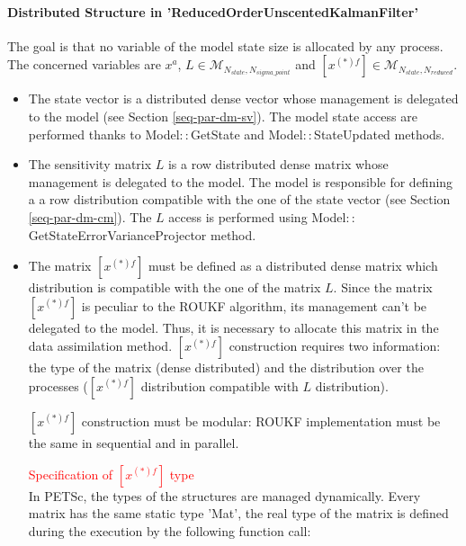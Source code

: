 \hypertarget{seq-par-roukf-ds}{}\paragraph{Distributed Structure in 'ReducedOrderUnscentedKalmanFilter'}\label{seq-par-roukf-ds}


The goal is that no variable of the model state size is allocated by any process. The concerned variables are  $x^a$, $L \in \mathcal{M}_{N_{state}, N_{sigma\_point}}$ and $ [x^{(*)f}] \in \mathcal{M}_{N_{state}, N_{reduced}}$.


\begin{itemize}

\item The state vector is a distributed dense vector whose management is delegated to the model (see Section \ref{seq-par-dm-sv}). The model state access are performed thanks to Model$::$GetState and Model$::$StateUpdated methods.

\item The sensitivity matrix $L$ is a row distributed dense matrix whose management is delegated to the model. The model is responsible for defining a a row distribution compatible with the one of the state vector (see Section \ref{seq-par-dm-cm}). The $L$ access is performed using Model$::$GetStateErrorVarianceProjector method.

\item The matrix $ [x^{(*)f}]$ must be defined as a distributed dense matrix which distribution is compatible with the one of the matrix $L$. Since the matrix  $ [x^{(*)f}]$ is peculiar to the ROUKF algorithm, its management can't be delegated to the model. Thus, it is necessary to allocate this matrix in the data assimilation method. $ [x^{(*)f}]$ construction requires two information: the type of the matrix (dense distributed) and the distribution over the processes ($[x^{(*)f}]$ distribution compatible with $L$ distribution).


$ [x^{(*)f}]$ construction must be modular: ROUKF implementation must be the same in sequential and in parallel.


\par \textcolor{red}{Specification of $ [x^{(*)f}]$ type}\\

In PETSc, the types of the structures are managed dynamically. Every matrix has the same static type 'Mat', the real type of the matrix is defined during the execution by the following function call:


\end{itemize}
